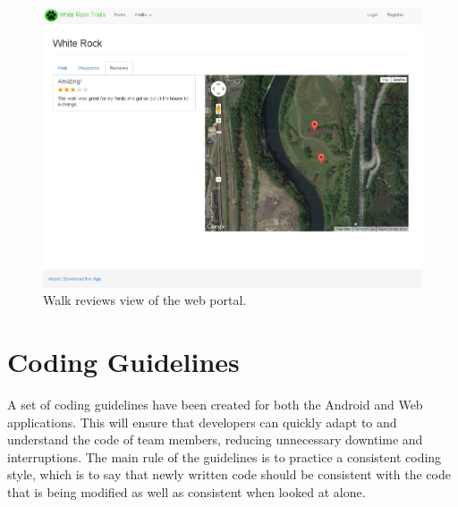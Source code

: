 \documentclass[11pt,a4paper]{article}
\begin{document}
\begin{figure}[H]
\centering
\includegraphics[width=0.8\linewidth]{./img/webportal/walk-reviews}
\caption{Walk reviews view of the web portal.}
\label{fig:walk-reviews}
\end{figure}


\section{Coding Guidelines}
\label{sec:codingguidelines}
A set of coding guidelines have been created for both the Android and Web applications. This will ensure that developers can quickly adapt to and understand the code of team members, reducing unnecessary downtime and interruptions. The main rule of the guidelines is to practice a consistent coding style, which is to say that newly written code should be consistent with the code that is being modified as well as consistent when looked at alone.
\end{document}
